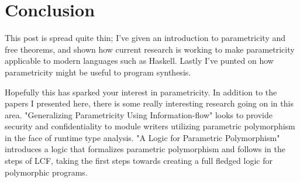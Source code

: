 \section{Conclusion}
This post is spread quite thin; I've given an introduction to parametricity and free theorems, and shown how current research is working to make parametricity applicable to modern languages such as Haskell. Lastly I've punted on how parametricity might be useful to program synthesis.

Hopefully this has sparked your interest in parametricity. In addition to the papers I presented here, there is some really interesting research going on in this area. "Generalizing Parametricity Using Information-flow" \cite{infoFlow} looks to provide security and confidentiality to module writers utilizing parametric polymorphism in the face of runtime type analysis. "A Logic for Parametric Polymorphism" \cite{paraLogic} introduces a logic that formalizes parametric polymorphism and follows in the steps of LCF, taking the first steps towards creating a full fledged logic for polymorphic programs.
